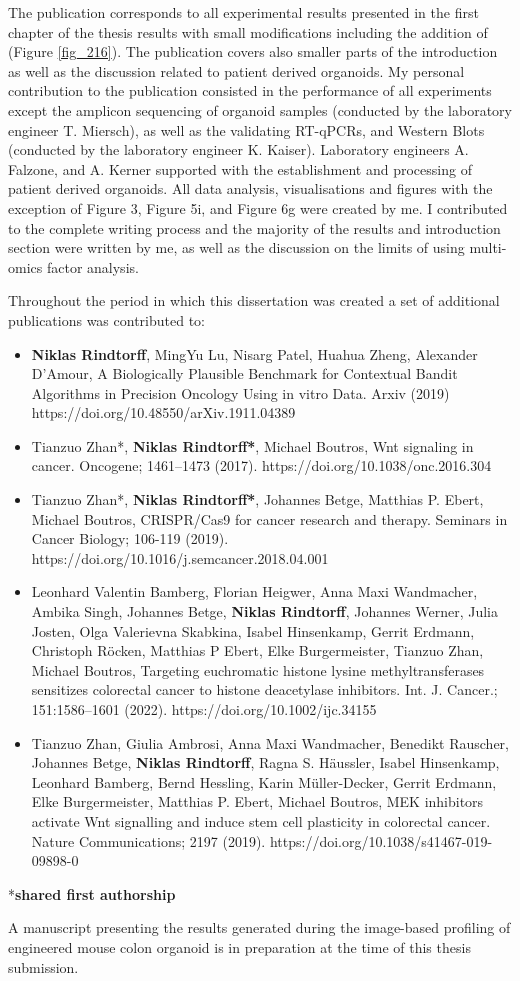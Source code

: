 The publication corresponds to all experimental results presented in the first chapter of the thesis results with small modifications including the addition of (Figure \ref{fig_216}). The publication covers also smaller parts of the introduction as well as the discussion related to patient derived organoids. My personal contribution to the publication consisted in the performance of all experiments except the amplicon sequencing of organoid samples (conducted by the laboratory engineer T. Miersch), as well as the validating RT-qPCRs, and Western Blots (conducted by the laboratory engineer K. Kaiser). Laboratory engineers A. Falzone, and A. Kerner supported with the establishment and processing of patient derived organoids. All data analysis, visualisations and figures with the exception of Figure 3, Figure 5i, and Figure 6g were created by me. I contributed to the complete writing process and the majority of the results and introduction section were written by me, as well as the discussion on the limits of using multi-omics factor analysis.
\bigbreak

Throughout the period in which this dissertation was created a set of additional publications was contributed to: 
\begin{itemize} 
    \item \textbf{Niklas Rindtorff}, MingYu Lu, Nisarg Patel, Huahua Zheng, Alexander D'Amour, A Biologically Plausible Benchmark for Contextual Bandit Algorithms in Precision Oncology Using in vitro Data. Arxiv (2019) https://doi.org/10.48550/arXiv.1911.04389
    \item Tianzuo Zhan*, \textbf{Niklas Rindtorff*}, Michael Boutros, Wnt signaling in cancer. Oncogene; 1461–1473 (2017). https://doi.org/10.1038/onc.2016.304
    \item Tianzuo Zhan*, \textbf{Niklas Rindtorff*}, Johannes Betge, Matthias P. Ebert, Michael Boutros, CRISPR/Cas9 for cancer research and therapy. Seminars in Cancer Biology; 106-119 (2019). https://doi.org/10.1016/j.semcancer.2018.04.001
    \item Leonhard Valentin Bamberg, Florian Heigwer, Anna Maxi Wandmacher, Ambika Singh, Johannes Betge, \textbf{Niklas Rindtorff}, Johannes Werner, Julia Josten, Olga Valerievna Skabkina, Isabel Hinsenkamp, Gerrit Erdmann, Christoph Röcken, Matthias P Ebert, Elke Burgermeister, Tianzuo Zhan, Michael Boutros, Targeting euchromatic histone lysine methyltransferases
sensitizes colorectal cancer to histone deacetylase inhibitors. Int. J. Cancer.; 151:1586–1601 (2022). https://doi.org/10.1002/ijc.34155
    \item Tianzuo Zhan, Giulia Ambrosi, Anna Maxi Wandmacher, Benedikt Rauscher, Johannes Betge, \textbf{Niklas Rindtorff}, Ragna S. Häussler, Isabel Hinsenkamp, Leonhard Bamberg, Bernd Hessling, Karin Müller-Decker, Gerrit Erdmann, Elke Burgermeister, Matthias P. Ebert, Michael Boutros, MEK inhibitors activate Wnt signalling and induce stem cell plasticity in colorectal cancer. Nature Communications; 2197 (2019). https://doi.org/10.1038/s41467-019-09898-0
\end{itemize}
*\textbf{shared first authorship}
\bigbreak

A manuscript presenting the results generated during the image-based profiling of engineered mouse colon organoid is in preparation at the time of this thesis submission.
